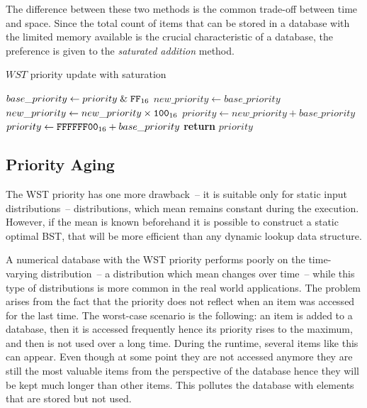 The difference between these two methods is the common trade-off between time and space. Since the total count of items that can be stored in a database with the limited memory available is the crucial characteristic of a database, the preference is given to the \emph{saturated addition} method.
\begin{algorithm}
\caption{$WST$ priority update with saturation}\label{alg:wst_priority2}
\begin{algorithmic}[1]
    \State $base\_priority\gets priority \mathrel{\&} \texttt{FF}_{16}$
    \State $new\_priority\gets base\_priority$
    \State $new\_priority \gets new\_priority \times \texttt{100}_{16}$
    \State{}
      \State $priority \gets new\_priority + base\_priority$
    \Else
      \State $priority \gets \texttt{FFFFFF00}_{16} + base\_priority$
    \EndIf
    \State \textbf{return} $priority$
  \EndProcedure
\end{algorithmic}
\end{algorithm}

\subsection{Priority Aging}
\label{sssec:priority_aging}
The WST priority has one more drawback~-- it is suitable only for static input distributions~-- distributions, which mean remains constant during the execution. However, if the mean is known beforehand it is possible to construct a static optimal BST\cite[p.~442]{knuth3}, that will be more efficient than any dynamic lookup data structure.

A numerical database with the WST priority performs poorly on the time-varying distribution~-- a distribution which mean changes over time~-- while this type of distributions is more common in the real world applications. The problem arises from the fact that the priority does not reflect when an item was accessed for the last time. The worst-case scenario is the following: an item is added to a database, then it is accessed frequently hence its priority rises to the maximum, and then is not used over a long time. During the runtime, several items like this can appear. Even though at some point they are not accessed anymore they are still the most valuable items from the perspective of the database hence they will be kept much longer than other items. This pollutes the database with elements that are stored but not used.

